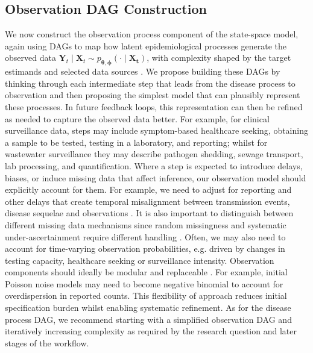 \documentclass{article}
\begin{document}
\subsection{Observation DAG Construction} \label{sec:observation}

We now construct the observation process component of the state-space model, again using \ac{DAG}s to map how latent epidemiological processes generate the observed data $\boldsymbol{Y}_t \mid \boldsymbol{X}_t \sim p_{\boldsymbol{\theta},\boldsymbol{\phi}}(\cdot \mid \boldsymbol{X_t})$, with complexity shaped by the target estimands and selected data sources \citep{deangelis2018analysing,birrell2018evidence}.
We propose building these \ac{DAG}s by thinking through each intermediate step that leads from the disease process to observation and then proposing the simplest model that can plausibly represent these processes.
In future feedback loops, this representation can then be refined as needed to capture the observed data better.
For example, for clinical surveillance data, steps may include symptom-based healthcare seeking, obtaining a sample to be tested, testing in a laboratory, and reporting; whilst for wastewater surveillance they may describe pathogen shedding, sewage transport, lab processing, and quantification.
Where a step is expected to introduce delays, biases, or induce missing data that affect inference, our observation model should explicitly account for them. For example, we need to adjust for reporting and other delays that create temporal misalignment between transmission events, disease sequelae and observations  \citep{seaman2022nowcasting}. It is also important to distinguish between different missing data mechanisms since random missingness and systematic under-ascertainment require different handling \citep{sherratt2021exploring}. Often, we may  also need to account for time-varying observation probabilities, e.g. driven by changes in testing capacity, healthcare seeking or surveillance intensity. Observation components should ideally be modular and replaceable  \citep{gelman2020bayesian}. For example, initial Poisson noise models may need to become negative binomial to account for overdispersion in reported counts. This flexibility of approach reduces initial specification burden whilst enabling systematic refinement.
As for the disease process \ac{DAG}, we recommend starting with a simplified observation DAG and iteratively increasing complexity as required by the research question and later stages of the workflow.
\end{document}
